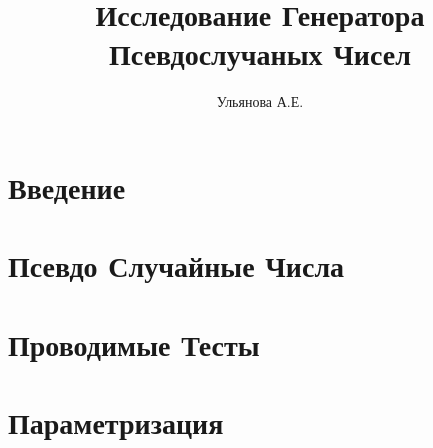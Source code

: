 \documentclass[12pt]{article}
\title{Исследование Генератора Псевдослучаных Чисел}
\date{}
\author{Ульянова А.Е.}
\begin{document}
\maketitle
\clearpage
\section{Введение}

\section{Псевдо Случайные Числа}

\section{Проводимые Тесты}

\section{Параметризация}
%
%
%
%
%
%
\end{document}

